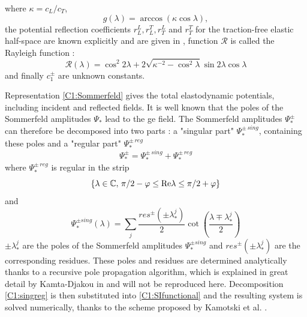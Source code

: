 where $\kappa=c_L/c_T$,
\begin{equation}
g(\lambda)=\arccos(\kappa\cos\lambda),
\end{equation}
the potential reflection coefficients $r_L^L,r_L^T,r_T^L$ and $r_T^T$ for the traction-free elastic half-space are known explicitly and are given in \cite{KamotskiFradkin}, function $\mathcal{R}$ is called the Rayleigh function :
\begin{equation}
\mathcal{R}(\lambda)=\cos^2 2\lambda+2\sqrt{\kappa^{-2}-\cos^2\lambda}\sin 2\lambda \cos\lambda
\label{C1:defRayleigh}
\end{equation}
and finally $c_1^\pm$ are unknown constants.

Representation \eqref{C1:Sommerfeld} gives the total elastodynamic potentials, including incident and reflected fields. It is well known that the poles of the Sommerfeld amplitudes $\Psi_*$ lead to the \acrshort{ge} field. The Sommerfeld amplitudes $\Psi_*^\pm$ can therefore be decomposed into two parts : a "singular part" $\Psi_*^{\pm \, sing}$, containing these poles and a "regular part" $\Psi_*^{\pm \, reg}$
\begin{equation}
\Psi_*^\pm=\Psi_*^{\pm \, sing}+\Psi_*^{\pm \, reg}
\label{C1:singreg}
\end{equation}
where $\Psi_*^{\pm \, reg}$ is regular in the strip 
\begin{equation}
\{ \lambda \in \mathbb{C},\, \pi/2-\varphi \leq \rm Re \lambda \leq \pi/2+\varphi \}
\end{equation}
and
\begin{equation}
\Psi_*^{\pm sing}(\lambda)=\sum_j \dfrac{res^\pm(\pm \lambda_*^j)}{2}\cot\left(\dfrac{\lambda\mp\lambda_*^j}{2}\right)
\end{equation}
$\pm\lambda_*^j$ are the poles of the Sommerfeld amplitudes $\Psi_*^{\pm sing}$ and  $res^\pm(\pm \lambda_*^j)$ are the corresponding residues. These poles and residues are determined analytically thanks to a recursive pole propagation algorithm, which is explained in great detail by Kamta-Djakou in \cite{AKDthese} and will not be reproduced here. Decomposition \eqref{C1:singreg} is then substituted into \eqref{C1:SIfunctional} and the resulting system is solved numerically, thanks to the scheme proposed by Kamotski et al. \cite{KamotskiFradkin}.

